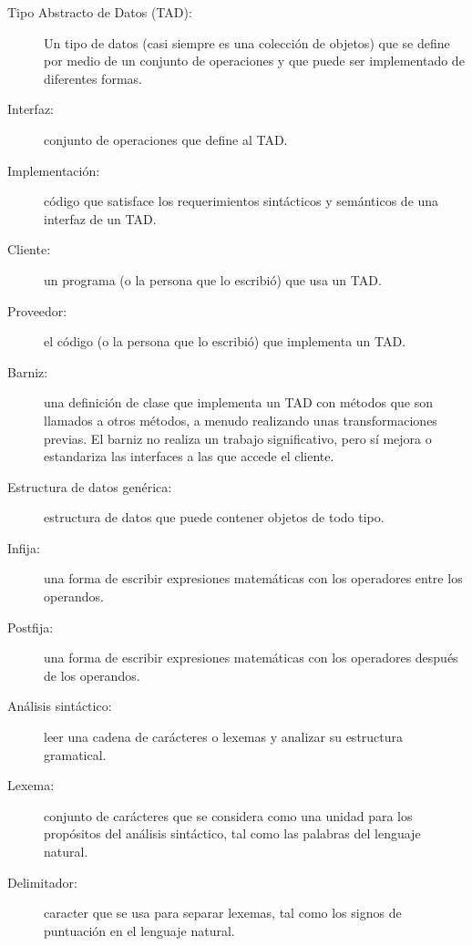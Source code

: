 \begin{description}

\item[Tipo Abstracto de Datos (TAD):] Un tipo de datos (casi siempre es 
una colección de objetos) que se define por medio de un conjunto de 
operaciones y que puede ser implementado de diferentes formas.

\item[Interfaz:] conjunto de operaciones que define al TAD.

\item[Implementación:] código que satisface los requerimientos
sintácticos y semánticos de una interfaz de un TAD.

\item[Cliente:]  un programa (o la persona que lo escribió) que usa un TAD.

\item[Proveedor:] el código  (o la persona que lo escribió) que implementa un TAD.

\item[Barniz:]  una definición de clase que implementa un TAD con 
métodos que son llamados a otros métodos, a menudo realizando unas
transformaciones previas. El barniz no realiza un trabajo significativo,
pero sí mejora o estandariza las interfaces a las que accede el cliente.

\item[Estructura de datos genérica:] estructura de datos que puede 
contener objetos de todo tipo.

\item[Infija:]  una forma de escribir expresiones matemáticas con los 
operadores entre los operandos.

\item[Postfija:]  una forma de escribir expresiones matemáticas con los 
operadores después de los operandos.

\item[Análisis sintáctico:]  leer una cadena de carácteres o lexemas y 
analizar su estructura gramatical.

\item[Lexema:]  conjunto de carácteres que se considera como una unidad
para los propósitos del análisis sintáctico, tal como las palabras del
lenguaje natural.

\item[Delimitador:] caracter que se usa para separar lexemas, tal como
los signos de puntuación en el lenguaje natural.

\end{description}
